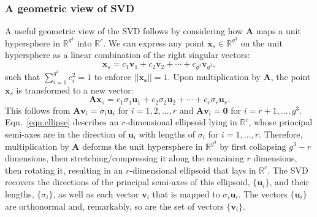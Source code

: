 \documentclass[journal=jacsat,manuscript=article,layout=traditional]{achemso}
\begin{document}
\subsubsection{A geometric view of SVD}
A useful geometric view of the SVD follows by considering how $\mathbf{A}$ maps a unit hypersphere in $\mathbb{R}^{g^3}$ into $\mathbb{R}^c$. We can express any point $\mathbf{x}_s\in \mathbb{R}^{g^3}$ on the unit hypersphere as a linear combination of the right singular vectors:
\begin{equation}
\mathbf{x}_s = c_1 \mathbf{v}_1 + c_2 \mathbf{v}_2 + \cdots + c_{g^3} \mathbf{v}_{g^3},
\end{equation} such that $\sum_{i=1}^{g^3} c_i^2 = 1$ to enforce $||\mathbf{x_s}||=1$. Upon multiplication by $\mathbf{A}$, the point $\mathbf{x}_s$ is transformed to a new vector:
\begin{equation}
\mathbf{A} \mathbf{x}_s = c_1 \sigma_1 \mathbf{u}_1 + c_2 \sigma_2 \mathbf{u}_2 + \cdots + c_r \sigma_r \mathbf{u}_r.
\label{eqn:ellipse}
\end{equation} This follows from $\mathbf{A} \mathbf{v}_i = \sigma_i \mathbf{u}_i$ for $i=1,2,...,r$ and $\mathbf{A} \mathbf{v}_i = \mathbf{0}$ for $i=r+1,...,g^3$. Eqn.~\ref{eqn:ellipse} describes an $r$-dimensional ellipsoid lying in $\mathbb{R}^c$, whose principal semi-axes are in the direction of $\mathbf{u}_i$ with lengths of $\sigma_i$ for $i=1,...,r$. Therefore, multiplication by $\mathbf{A}$ deforms the unit hypersphere in $\mathbb{R}^{g^3}$ by first collapsing $g^3-r$ dimensions, then stretching/compressing it along the remaining $r$ dimensions, then rotating it, resulting in an $r$-dimensional ellipsoid that lays in $\mathbb{R}^c$. The SVD recovers the directions of the principal semi-axes of this ellipsoid, $\{\mathbf{u}_i\}$, and their lengths, $\{\sigma_i\}$, as well as each vector $\mathbf{v}_i$ that is mapped to $\sigma_i \mathbf{u}_i$. The vectors $\{\mathbf{u}_i\}$ are orthonormal and, remarkably, so are the set of vectors $\{\mathbf{v}_i\}$.


\end{document}
